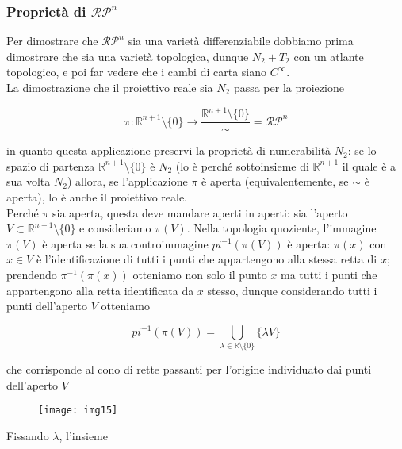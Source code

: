 \subsubsection{Proprietà di $ \mathcal{RP}^{n} $}

Per dimostrare che $ \mathcal{RP}^{n} $ sia una varietà differenziabile dobbiamo prima dimostrare che sia una varietà topologica, dunque $ N_{2}+T_{2} $ con un atlante topologico, e poi far vedere che i cambi di carta siano $ C^{\infty} $.\\
La dimostrazione che il proiettivo reale sia $ N_{2} $ passa per la proiezione

\begin{equation}
	\pi : \mathbb{R}^{n+1} \setminus \{0\} \to \dfrac{\mathbb{R}^{n+1} \setminus \{0\}}{\sim} = \mathcal{RP}^{n}
\end{equation}

in quanto questa applicazione preservi la proprietà di numerabilità $ N_{2} $: se lo spazio di partenza $ \mathbb{R}^{n+1} \setminus \{0\} $ è $ N_{2} $ (lo è perché sottoinsieme di $ \mathbb{R}^{n+1} $ il quale è a sua volta $ N_{2} $) allora, se l'applicazione $ \pi $ è aperta (equivalentemente, se $ \sim $ è aperta), lo è anche il proiettivo reale.\\
Perché $ \pi $ sia aperta, questa deve mandare aperti in aperti: sia l'aperto $ V \subset \mathbb{R}^{n+1} \setminus \{0\} $ e consideriamo $ \pi(V) $. Nella topologia quoziente, l'immagine $ \pi(V) $ è aperta se la sua controimmagine $ pi^{-1}(\pi(V)) $ è aperta: $ \pi(x) $ con $ x \in V $ è l'identificazione di tutti i punti che appartengono alla stessa retta di $ x $; prendendo $ \pi^{-1}(\pi(x)) $ otteniamo non solo il punto $ x $ ma tutti i punti che appartengono alla retta identificata da $ x $ stesso, dunque considerando tutti i punti dell'aperto $ V $ otteniamo

\begin{equation}
	pi^{-1}(\pi(V)) = \bigcup_{\lambda \in \mathbb{R} \setminus \{0\}} \{\lambda V\}
\end{equation}

che corrisponde al cono di rette passanti per l'origine individuato dai punti dell'aperto $ V $

\begin{figure}[H]
	\centering
	\texttt{[image: img15]}
\end{figure}

Fissando $ \lambda $, l'insieme

